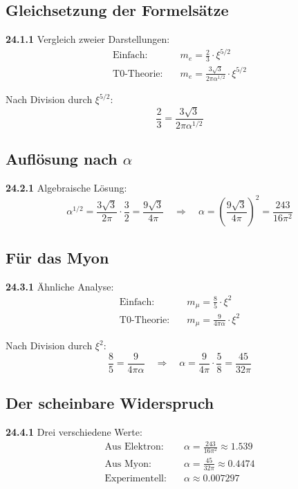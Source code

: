 \subsection{Gleichsetzung der Formelsätze}

\noindent \textbf{24.1.1} Vergleich zweier Darstellungen:
\begin{align*}
	\text{Einfach:} &\quad m_e = \frac{2}{3} \cdot \xi^{5/2} \\
	\text{T0-Theorie:} &\quad m_e = \frac{3\sqrt{3}}{2\pi\alpha^{1/2}} \cdot \xi^{5/2}
\end{align*}

Nach Division durch $\xi^{5/2}$:
\[
\frac{2}{3} = \frac{3\sqrt{3}}{2\pi\alpha^{1/2}}
\]

\subsection{Auflösung nach $\alpha$}

\noindent \textbf{24.2.1} Algebraische Lösung:
\[
\alpha^{1/2} = \frac{3\sqrt{3}}{2\pi} \cdot \frac{3}{2} = \frac{9\sqrt{3}}{4\pi}
\quad \Rightarrow \quad
\alpha = \left(\frac{9\sqrt{3}}{4\pi}\right)^2 = \frac{243}{16\pi^2}
\]

\subsection{Für das Myon}

\noindent \textbf{24.3.1} Ähnliche Analyse:
\begin{align*}
	\text{Einfach:} &\quad m_\mu = \frac{8}{5} \cdot \xi^2 \\
	\text{T0-Theorie:} &\quad m_\mu = \frac{9}{4\pi\alpha} \cdot \xi^2
\end{align*}

Nach Division durch $\xi^2$:
\[
\frac{8}{5} = \frac{9}{4\pi\alpha}
\quad \Rightarrow \quad
\alpha = \frac{9}{4\pi} \cdot \frac{5}{8} = \frac{45}{32\pi}
\]

\subsection{Der scheinbare Widerspruch}

\noindent \textbf{24.4.1} Drei verschiedene Werte:
\begin{align*}
	\text{Aus Elektron:} &\quad \alpha = \frac{243}{16\pi^2} \approx 1.539 \\
	\text{Aus Myon:} &\quad \alpha = \frac{45}{32\pi} \approx 0.4474 \\
	\text{Experimentell:} &\quad \alpha \approx 0.007297
\end{align*}

